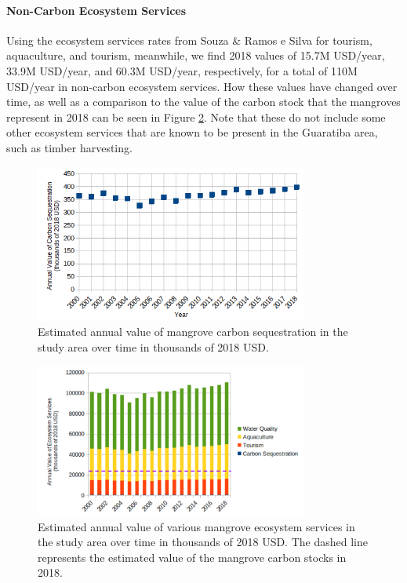 \paragraph{Non-Carbon Ecosystem Services} \leavevmode\newline


Using the ecosystem services rates from Souza \& Ramos e Silva \cite{souzaEcologicalEconomicValuation2011} for tourism, aquaculture, and tourism, meanwhile, we find 2018 values of 15.7M USD/year, 33.9M USD/year, and 60.3M USD/year, respectively, for a total of 110M USD/year in non-carbon ecosystem services. How these values have changed over time, as well as a comparison to the value of the carbon stock that the mangroves represent in 2018 can be seen in Figure \ref{fig:annual_ecosystem_services}. Note that these do not include some other ecosystem services that are known to be present in the Guaratiba area, such as timber harvesting.

\begin{figure}[H] 
\centering
\includegraphics[width=0.8\textwidth]{Figures/chap4/carbon_sequestration_value.png}
\caption[Annual Value of Mangrove Carbon Sequestration]{Estimated annual value of mangrove carbon sequestration in the study area over time in thousands of 2018 USD.}
\label{fig:carbon_sequestration_value}
\end{figure}

\begin{figure}[H] 
\centering
\includegraphics[width=0.8\textwidth]{Figures/chap4/annual_ecosystem_services.png}
\caption[Annual Value of Mangrove Ecosystem Services]{Estimated annual value of various mangrove ecosystem services in the study area over time in thousands of 2018 USD. The dashed line represents the estimated value of the mangrove carbon stocks in 2018.}
\label{fig:annual_ecosystem_services}
\end{figure}



